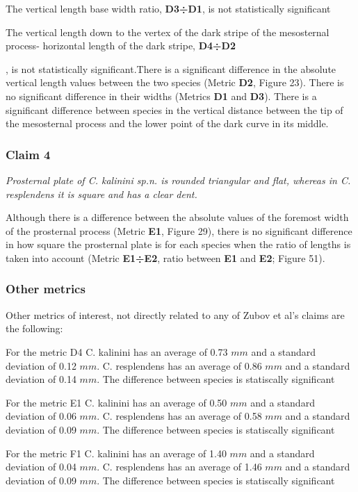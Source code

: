The vertical length base width ratio, \textbf{D3÷D1},  is not statistically significant 

The vertical length down to the vertex of the dark stripe of the mesosternal process- horizontal length of the dark stripe, \textbf{D4÷D2}

, is not statistically significant.There is a significant difference in  the absolute vertical length values between the two species (Metric \textbf{D2}, Figure 23). There is no significant difference in their widths (Metrics \textbf{D1} and \textbf{D3}). There is a significant difference between species in the vertical distance between the tip of the mesosternal process and the lower point of the dark curve in its middle.

\subsubsection*{Claim 4}
\textit{Prosternal plate of \textit{C. kalinini sp.n.} is rounded triangular and flat, whereas in \textit{C. resplendens} it is square and has a clear dent.}

Although there is a difference between the absolute values of the foremost width of the prosternal process (Metric \textbf{E1}, Figure 29), there is no significant difference in how square the prosternal plate is for each species when the ratio of lengths is taken into account (Metric \textbf{E1÷E2}, ratio between \textbf{E1} and \textbf{E2}; Figure 51).

\subsubsection*{Other metrics}
Other metrics of interest, not directly related to any of Zubov et al's claims are the following:

For the metric D4 C. kalinini has an average of 0.73 $mm$ and a standard deviation of  0.12 $mm$. C. resplendens has an average of 0.86 $mm$ and a standard deviation of  0.14 $mm$. The difference between species is statiscally significant


For the metric E1 C. kalinini has an average of 0.50 $mm$ and a standard deviation of  0.06 $mm$. C. resplendens has an average of 0.58 $mm$ and a standard deviation of  0.09 $mm$. The difference between species is statiscally significant


For the metric F1 C. kalinini has an average of 1.40 $mm$ and a standard deviation of  0.04 $mm$. C. resplendens has an average of 1.46 $mm$ and a standard deviation of  0.09 $mm$. The difference between species is statiscally significant


